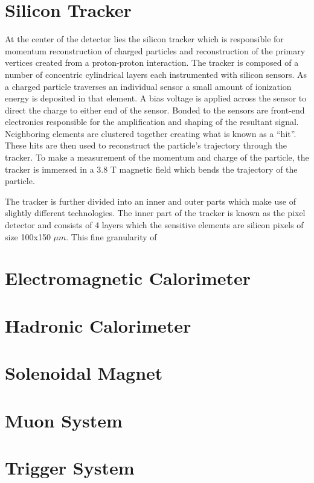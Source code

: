 \section{Silicon Tracker}
At the center of the detector lies the silicon tracker which is responsible for momentum reconstruction of charged particles and reconstruction of the primary vertices created from a proton-proton interaction. The tracker is composed of a number of concentric cylindrical layers each instrumented with silicon sensors. As a charged particle traverses an individual sensor a small amount of ionization energy is deposited in that element. A bias voltage is applied across the sensor to direct the charge to either end of the sensor. Bonded to the sensors are front-end electronics responsible for the amplification and shaping of the resultant signal. Neighboring elements are clustered together creating what is known as a ``hit''. These hits are then used to reconstruct the particle's trajectory through the tracker. To make a measurement of the momentum and charge of the particle, the tracker is immersed in a 3.8 T magnetic field which bends the trajectory of the particle.

The tracker is further divided into an inner and outer parts which make use of slightly different technologies. The inner part of the tracker is known as the pixel detector and consists of 4 layers which the sensitive elements are silicon pixels of size 100x150 $\mu m$. This fine granularity of

\section{Electromagnetic Calorimeter}
\section{Hadronic Calorimeter}
\section{Solenoidal Magnet}
\section{Muon System}
\section{Trigger System}
